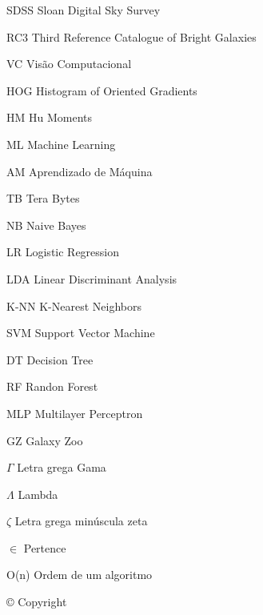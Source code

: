 \begin{siglas}
  \item[SDSS] Sloan Digital Sky Survey
  
  \item[RC3] Third Reference Catalogue of Bright Galaxies
  \item[VC] Visão Computacional
  \item[HOG] Histogram of Oriented Gradients 
  \item[HM] Hu Moments 
  \item[ML] Machine Learning
  \item[AM] Aprendizado de Máquina
  \item[TB] Tera Bytes
  \item[NB] Naive Bayes
  \item[LR] Logistic Regression
  \item[LDA] Linear Discriminant Analysis
  \item[K-NN] K-Nearest Neighbors 
  \item[SVM] Support Vector Machine 
  \item[DT] Decision Tree 
  \item[RF] Randon Forest 
  \item[MLP] Multilayer Perceptron 
  \item[GZ] Galaxy Zoo 
\end{siglas}

\begin{simbolos}
  \item[$ \Gamma $] Letra grega Gama
  \item[$ \Lambda $] Lambda
  \item[$ \zeta $] Letra grega minúscula zeta
  \item[$ \in $] Pertence
  \item[O(n)] Ordem de um algoritmo
  \item[©] Copyright
\end{simbolos}

\tableofcontents*
\cleardoublepage